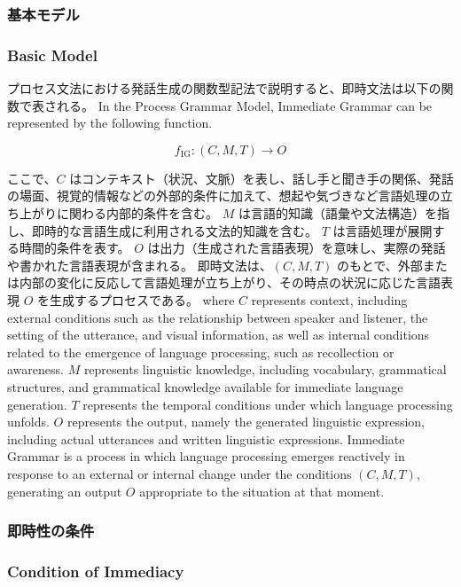\documentclass[a4paper]{article}
\begin{document}
\ifJPN
\subsubsection{基本モデル}
\else
\subsubsection{Basic Model}
\fi

\ifJPN
プロセス文法における発話生成の関数型記法で説明すると、即時文法は以下の関数で表される。
\else
In the Process Grammar Model, Immediate Grammar can be represented by the following function.
\fi

\[
  f_{\text{IG}} : (C, M, T) \to O
\]

\ifJPN
ここで、\( C \) はコンテキスト（状況、文脈）を表し、話し手と聞き手の関係、発話の場面、視覚的情報などの外部的条件に加えて、想起や気づきなど言語処理の立ち上がりに関わる内部的条件を含む。
\( M \) は言語的知識（語彙や文法構造）を指し、即時的な言語生成に利用される文法的知識を含む。
\( T \) は言語処理が展開する時間的条件を表す。
\( O \) は出力（生成された言語表現）を意味し、実際の発話や書かれた言語表現が含まれる。
即時文法は、\((C, M, T)\) のもとで、外部または内部の変化に反応して言語処理が立ち上がり、その時点の状況に応じた言語表現 \( O \) を生成するプロセスである。
\else
where \( C \) represents context, including external conditions such as the relationship between speaker and listener, the setting of the utterance, and visual information, as well as internal conditions related to the emergence of language processing, such as recollection or awareness.
\( M \) represents linguistic knowledge, including vocabulary, grammatical structures, and grammatical knowledge available for immediate language generation.
\( T \) represents the temporal conditions under which language processing unfolds.
\( O \) represents the output, namely the generated linguistic expression, including actual utterances and written linguistic expressions.
Immediate Grammar is a process in which language processing emerges reactively in response to an external or internal change under the conditions \((C, M, T)\), generating an output \( O \) appropriate to the situation at that moment.
\fi

\ifJPN
\subsubsection{即時性の条件}
\else
\subsubsection{Condition of Immediacy}
\fi
\end{document}
